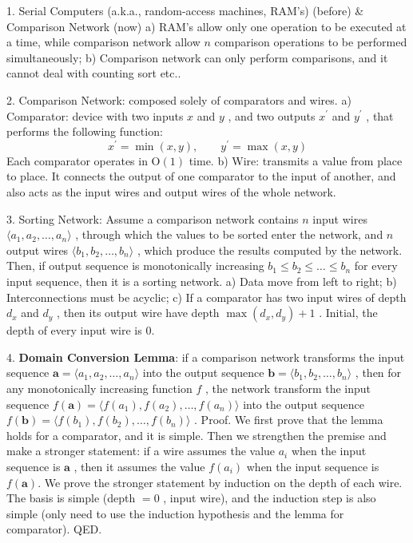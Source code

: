 \documentclass[10pt,a4paper]{article}
\begin{document}
1. Serial Computers (a.k.a., random-access machines, RAM's) (before) \& Comparison Network (now)
a) RAM's allow only one operation to be executed at a time, while comparison network allow \(n\) comparison operations to be performed simultaneously;
b) Comparison network can only perform comparisons, and it cannot deal with counting sort etc..

2. Comparison Network: composed solely of comparators and wires.
a) Comparator: device with two inputs \(x\) and \(y\) , and two outputs \(x^{\prime}\) and \(y^{\prime}\) , that performs the following function:
\[
x^{\prime} = \min (x,y),\qquad y^{\prime} = \max (x,y)
\]
Each comparator operates in \(\mathrm{O}(1)\) time.
b) Wire: transmits a value from place to place. It connects the output of one comparator to the input of another, and also acts as the input wires and output wires of the whole network.

3. Sorting Network: Assume a comparison network contains \(n\) input wires \(\langle a_1,a_2,\dots,a_n\rangle\) , through which the values to be sorted enter the network, and \(n\) output wires \(\langle b_1,b_2,\dots,b_n\rangle\) , which produce the results computed by the network. Then, if output sequence is monotonically increasing \(b_1\leq b_2\leq \dots \leq b_n\) for every input sequence, then it is a sorting network.
a) Data move from left to right;
b) Interconnections must be acyclic;
c) If a comparator has two input wires of depth \(d_{x}\) and \(d_{y}\) , then its output wire have depth \(\max (d_{x},d_{y}) + 1\) . Initial, the depth of every input wire is 0.

4. \textbf{Domain Conversion Lemma}: if a comparison network transforms the input sequence \(\pmb {a} = \langle a_{1},a_{2},\dots ,a_{n}\rangle\) into the output sequence \(\pmb {b} = \langle b_{1},b_{2},\dots ,b_{n}\rangle\) , then for any monotonically increasing function \(f\) , the network transform the input sequence \(f(\pmb {a}) = \langle f(a_{1}),f(a_{2}),\dots ,f(a_{n})\rangle\) into the output sequence \(f(\pmb {b}) = \langle f(b_{1}),f(b_{2}),\dots ,f(b_{n})\rangle\) .
Proof. We first prove that the lemma holds for a comparator, and it is simple. Then we strengthen the premise and make a stronger statement: if a wire assumes the value \(a_{i}\) when the input sequence is \(\pmb{a}\) , then it assumes the value \(f(a_{i})\) when the input sequence is \(f(\pmb {a})\). We prove the stronger statement by induction on the depth of each wire. The basis is simple (depth \(= 0\) , input wire), and the induction step is also simple (only need to use the induction hypothesis and the lemma for comparator). QED.
\end{document}
